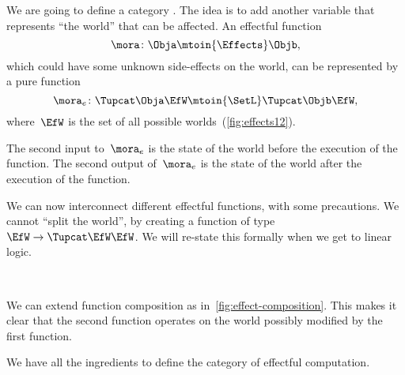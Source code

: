 We are going to define a category \Effects.
The idea is to add another variable that represents ``the world'' that can be affected.
An effectful function
%
\begin{equation}
    \mora\colon \Obja \mtoin{\Effects} \Objb,
\end{equation}
%
which could have some unknown side-effects on the world, can be represented by a pure function
%
\begin{equation}
    \mora_e\colon  \Tupcat \Obja   \EfW \mtoin{\SetL}   \Tupcat  \Objb \EfW,
\end{equation}
%
where~$\EfW$ is the set of all possible worlds~(\cref{fig:effects12}).

The second input to~$\mora_e$ is the state of the world before the execution of the function.
The second output of~$\mora_e$ is the state of the world after the execution of the function.

We can now interconnect different effectful functions, with some precautions.
We cannot ``split the world'', by creating a function of type~$\EfW \to \Tupcat \EfW \EfW$.
We will re-state this formally when we get to linear logic.

\begin{marginfigure}
    \centering
    \\
    \caption{}
    \label{fig:effect-composition}
\end{marginfigure}

We can extend function composition as in~\cref{fig:effect-composition}.
This makes it clear that the second function operates on the world possibly modified by the first function.

We have all the ingredients to define the category \Effects of effectful computation.

